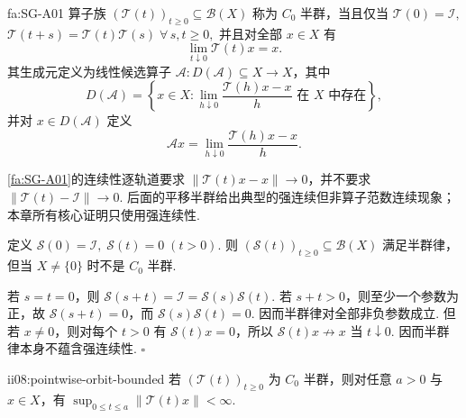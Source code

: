 \begin{FADefinition}{fa:SG-A01}
算子族 \(\displaystyle(\mathcal T(t))_{t\geqslant0}\subseteq\mathcal B(X)\) 称为 \(\displaystyle C_0\) 半群，当且仅当
\(\displaystyle \mathcal T(0)=\mathcal I,\)
\(\displaystyle \mathcal T(t+s)=\mathcal T(t)\mathcal T(s) \; \forall\,s,t\geqslant0,\)
并且对全部 \(\displaystyle x\in X\) 有
\[
\lim_{t\downarrow0}\mathcal T(t)x=x.
\]
其生成元定义为线性候选算子 \(\displaystyle\mathcal A:D(\mathcal A)\subseteq X\to X\)，其中
\[
D(\mathcal A)
=
\left\{
 x\in X:
 \lim_{h\downarrow0}\frac{\mathcal T(h)x-x}{h}
 \text{ 在 }X\text{ 中存在}
\right\},
\]
并对 \(\displaystyle x\in D(\mathcal A)\) 定义
\[
\mathcal Ax
=
\lim_{h\downarrow0}\frac{\mathcal T(h)x-x}{h}.
\]
\end{FADefinition}

\begin{FARemark}[强连续不等于算子范数连续]
\autoref{fa:SG-A01}的连续性逐轨道要求 \(\displaystyle\|\mathcal T(t)x-x\|\to0\)，并不要求 \(\displaystyle\|\mathcal T(t)-\mathcal I\|\to0\). 后面的平移半群给出典型的强连续但非算子范数连续现象；本章所有核心证明只使用强连续性.
\end{FARemark}

\begin{FACounterexample}[半群律不推出强连续]\label{ii08:non-c0-semigroup}
定义
\(\displaystyle \mathcal S(0)=\mathcal I, \; \mathcal S(t)=0 \;(t>0).\)
则 \(\displaystyle(\mathcal S(t))_{t\geqslant0}\subseteq\mathcal B(X)\) 满足半群律，但当 \(\displaystyle X\neq\{0\}\) 时不是 \(\displaystyle C_0\) 半群.
\end{FACounterexample}

\begin{FAProof}
若 \(\displaystyle s=t=0\)，则 \(\displaystyle\mathcal S(s+t)=\mathcal I=\mathcal S(s)\mathcal S(t)\). 若 \(\displaystyle s+t>0\)，则至少一个参数为正，故 \(\displaystyle\mathcal S(s+t)=0\)，而 \(\displaystyle\mathcal S(s)\mathcal S(t)=0\). 因而半群律对全部非负参数成立. 但若 \(\displaystyle x\neq0\)，则对每个 \(\displaystyle t>0\) 有 \(\displaystyle\mathcal S(t)x=0\)，所以 \(\displaystyle\mathcal S(t)x\not\to x\) 当 \(\displaystyle t\downarrow0\). 因而半群律本身不蕴含强连续性.
\hfill\(\square\)
\end{FAProof}

\begin{FALemma}[B][单轨道在紧时间区间上有界]{ii08:pointwise-orbit-bounded}
若 \(\displaystyle(\mathcal T(t))_{t\geqslant0}\) 为 \(\displaystyle C_0\) 半群，则对任意 \(\displaystyle a>0\) 与 \(\displaystyle x\in X\)，有 \(\displaystyle \sup_{0\leqslant t\leqslant a}\|\mathcal T(t)x\|<\infty\).
\end{FALemma}

